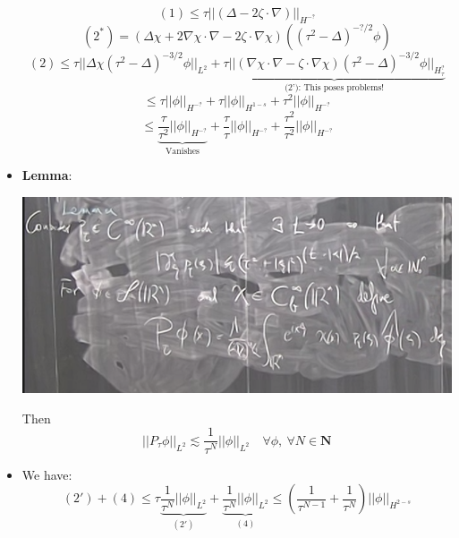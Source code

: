 \documentclass{article}
\begin{document}
\begin{itemize}
 
    \begin{equation}
        (1) \leq \tau ||(\Delta - 2 \zeta \cdot \nabla)||_{H^{-?}}
    \end{equation}
    \begin{equation}
        (2^*) = (\Delta \chi + 2 \nabla \chi \cdot \nabla - 2 \zeta \cdot \nabla \chi)((\tau^2 - \Delta)^{-?/2}\phi) 
    \end{equation}
    \begin{equation}
        (2) \leq \tau || \Delta \chi (\tau^2 - \Delta)^{-3/2} \phi ||_{L^2} + \underbrace{\tau ||(\nabla \chi \cdot \nabla - \zeta \cdot \nabla \chi)(\tau^2 - \Delta)^{-3/2}\phi ||_{H_\tau^?}}_{\text{(2'): This poses problems!}}
    \end{equation}
    \begin{equation}
        \leq \tau || \phi||_{H^{-?}} + \tau || \phi||_{H^{1-s}} + \tau^2 || \phi||_{H^{-?}}
    \end{equation}
    \begin{equation}
        \leq \underbrace{\frac{\tau}{\tau^2} || \phi||_{H^{-?}}}_{\text{Vanishes}} + \frac{\tau}{\tau} || \phi||_{H^{-?}} + \frac{\tau^2}{\tau^2} || \phi||_{H^{-?}}
    \end{equation}

    \item \textbf{Lemma}:
    
    \includegraphics[width=\textwidth]{screenshots/5.png}
    
    Then
    \begin{equation}
        || P_\tau \phi ||_{L^2} \lesssim \frac{1}{\tau^N} ||\phi||_{L^2} \quad \forall \phi, \ \forall N \in \mathbf{N}
    \end{equation}

    \item We have:
    \begin{equation}
        (2') + (4) \leq \tau \underbrace{\frac{1}{\tau^N} ||\phi||_{L^2}}_{(2')} + \underbrace{\frac{1}{\tau^N} || \phi||_{L^2}}_{(4)} \leq (\frac{1}{\tau^{N-1}} + \frac{1}{\tau^N})|| \phi||_{H^{2-s}}
    \end{equation}



\end{itemize}
\end{document}
